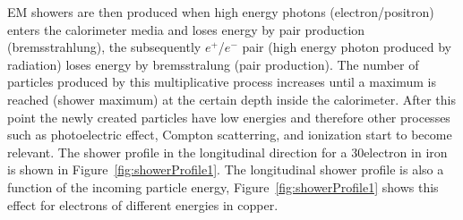 EM showers are then produced when high energy photons
(electron/positron) enters the calorimeter media and loses energy by
pair production (bremsstrahlung), the subsequently $e^{+}$/$e^{-}$
pair (high energy photon produced by radiation) loses energy by
bremsstralung (pair production). The number of particles produced by
this multiplicative process increases until a maximum is reached
(shower maximum) at the certain depth inside the calorimeter. After
this point the newly created particles have low energies and therefore other processes such as
photoelectric effect, Compton scatterring, and ionization start to
become relevant. The shower profile in the longitudinal direction for
a 30\GeV electron in iron is
shown in Figure~\ref{fig:showerProfile1}. The longitudinal shower
profile is also a function of the incoming particle energy,
Figure~\ref{fig:showerProfile1} shows this effect for electrons of
different energies in copper.

